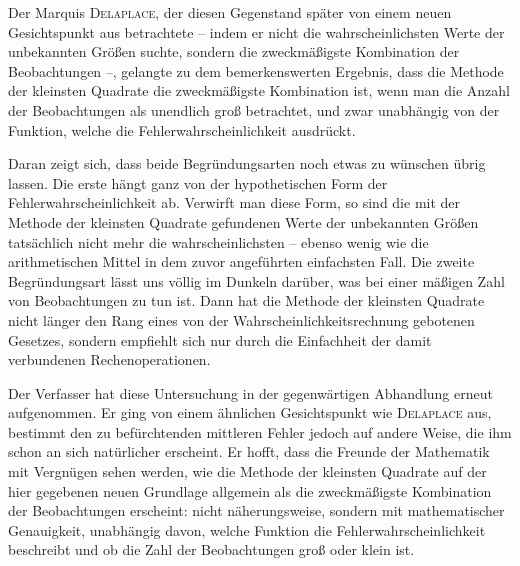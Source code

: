 Der Marquis \textsc{Delaplace}, der diesen Gegenstand später von einem neuen Gesichtspunkt aus betrachtete – indem er nicht die wahrscheinlichsten Werte der unbekannten Größen suchte, sondern die zweckmäßigste Kombination der Beobachtungen –, gelangte zu dem bemerkenswerten Ergebnis, dass die Methode der kleinsten Quadrate die zweckmäßigste Kombination ist, wenn man die Anzahl der Beobachtungen als unendlich groß betrachtet, und zwar unabhängig von der Funktion, welche die Fehlerwahrscheinlichkeit ausdrückt.

Daran zeigt sich, dass beide Begründungsarten noch etwas zu wünschen übrig lassen. Die erste hängt ganz von der hypothetischen Form der Fehlerwahrscheinlichkeit ab. Verwirft man diese Form, so sind die mit der Methode der kleinsten Quadrate gefundenen Werte der unbekannten Größen tatsächlich nicht mehr die wahrscheinlichsten – ebenso wenig wie die arithmetischen Mittel in dem zuvor angeführten einfachsten Fall. Die zweite Begründungsart lässt uns völlig im Dunkeln darüber, was bei einer mäßigen Zahl von Beobachtungen zu tun ist. Dann hat die Methode der kleinsten Quadrate nicht länger den Rang eines von der Wahrscheinlichkeitsrechnung gebotenen Gesetzes, sondern empfiehlt sich nur durch die Einfachheit der damit verbundenen Rechenoperationen.

Der Verfasser hat diese Untersuchung in der gegenwärtigen Abhandlung erneut aufgenommen. Er ging von einem ähnlichen Gesichtspunkt wie \textsc{Delaplace} aus, bestimmt den zu befürchtenden mittleren Fehler jedoch auf andere Weise, die ihm schon an sich natürlicher erscheint. Er hofft, dass die Freunde der Mathematik mit Vergnügen sehen werden, wie die Methode der kleinsten Quadrate auf der hier gegebenen neuen Grundlage allgemein als die zweckmäßigste Kombination der Beobachtungen erscheint: nicht näherungsweise, sondern mit mathematischer Genauigkeit, unabhängig davon, welche Funktion die Fehlerwahrscheinlichkeit beschreibt und ob die Zahl der Beobachtungen groß oder klein ist.


